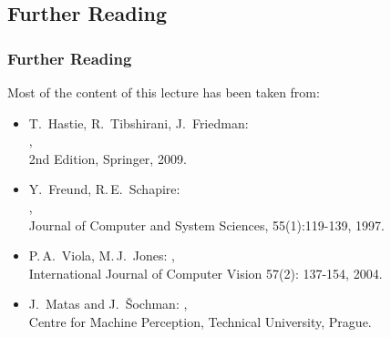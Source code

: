 \subsection{Further Reading}

\begin{frame}
  \frametitle{Further Reading}

  Most of the content of this lecture has been taken from: \\[.25cm]

  \small
  \begin{itemize}
    \item T.\ Hastie, R.\ Tibshirani, J.\ Friedman: \\
      , \\
      2nd Edition, Springer, 2009.\\%
    \item Y.\ Freund, R.\,E.\ Schapire: \\
      ,\\
      Journal of Computer and System Sciences, 55(1):119-139, 1997.\\%
    \item P.\,A.\ Viola, M.\,J.\ Jones: 
      , \\
      International Journal of Computer Vision 57(2): 137-154, 2004.\\%
    \item J.\ Matas and J.\ \v{S}ochman:
      , \\
      Centre for Machine Perception, Technical University, Prague. \\%
  \end{itemize}
\end{frame}
